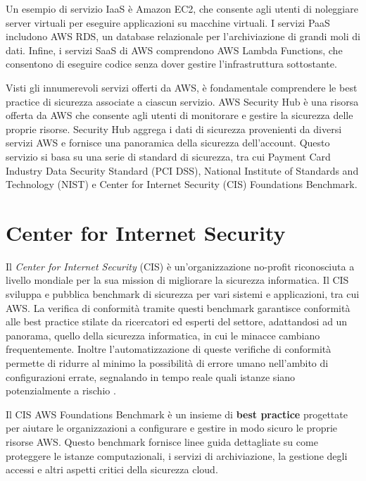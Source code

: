 Un esempio di servizio IaaS è Amazon EC2, che consente agli utenti di noleggiare server virtuali per eseguire applicazioni su macchine virtuali. I servizi PaaS includono AWS RDS, un database relazionale per l'archiviazione di grandi moli di dati. Infine, i servizi SaaS di AWS comprendono AWS Lambda Functions, che consentono di eseguire codice senza dover gestire l'infrastruttura sottostante.

Visti gli innumerevoli servizi offerti da AWS, è fondamentale comprendere le best practice di sicurezza associate a ciascun servizio. AWS Security Hub è una risorsa offerta da AWS che consente agli utenti di monitorare e gestire la sicurezza delle proprie risorse. Security Hub aggrega i dati di sicurezza provenienti da diversi servizi AWS e fornisce una panoramica della sicurezza dell'account. Questo servizio si basa su una serie di standard di sicurezza, tra cui Payment Card Industry Data Security Standard (PCI DSS), National Institute of Standards and Technology (NIST) e Center for Internet Security (CIS) Foundations Benchmark.

\section{Center for Internet Security}
\label{sec:cis}

Il \textit{Center for Internet Security} (CIS) è un'organizzazione no-profit riconosciuta a livello mondiale per la sua mission di migliorare la sicurezza informatica. Il CIS sviluppa e pubblica benchmark di sicurezza per vari sistemi e applicazioni, tra cui AWS. La verifica di conformità tramite questi benchmark garantisce conformità alle best practice stilate da ricercatori ed esperti del settore, adattandosi ad un panorama, quello della sicurezza informatica, in cui le minacce cambiano frequentemente. Inoltre l'automatizzazione di queste verifiche di conformità permette di ridurre al minimo la possibilità di errore umano nell'ambito di configurazioni errate, segnalando in tempo reale quali istanze siano potenzialmente a rischio \cite{10602274}.

Il CIS AWS Foundations Benchmark è un insieme di \textbf{best practice} progettate per aiutare le organizzazioni a configurare e gestire in modo sicuro le proprie risorse AWS. Questo benchmark fornisce linee guida dettagliate su come proteggere le istanze computazionali, i servizi di archiviazione, la gestione degli accessi e altri aspetti critici della sicurezza cloud.

